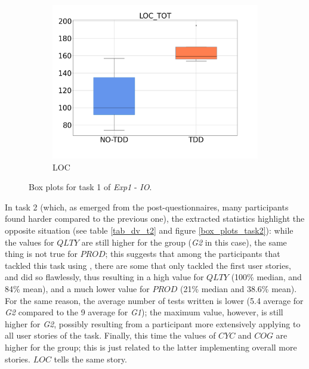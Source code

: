 \begin{figure}[H]
\begin{subfigure}{0.33\textwidth}
        \includegraphics[width=\linewidth]{figures/box_plots/task1/LOC.png}
        \caption{LOC}
        \label{bp_task1_loc}
    \end{subfigure}
    \caption{Box plots for task 1 of \textit{Exp1} - \textit{IO}.}
    \label{box_plots_task1}
\end{figure}

In task 2 (which, as emerged from the post-questionnaires, many participants found harder compared to the previous one), the extracted statistics highlight the opposite situation (see table \ref{tab_dv_t2} and figure \ref{box_plots_task2}): while the values for $QLTY$ are still higher for the \tdd group (\textit{G2} in this case), the same thing is not true for $PROD$; this suggests that among the participants that tackled this task using \tdd, there are some that only tackled the first user stories, and did so flawlessly, thus resulting in a high value for $QLTY$ (100\% median, and 84\% mean), and a much lower value for $PROD$ (21\% median and 38.6\% mean). 
For the same reason, the average number of tests written is lower (5.4 average for \textit{G2} compared to the 9 average for \textit{G1}); the maximum value, however, is still higher for \textit{G2}, possibly resulting from a participant more extensively applying \tdd to all user stories of the task.
Finally, this time the values of $CYC$ and $COG$ are higher for the \notdd group; this is just related to the latter implementing overall more stories. $LOC$ tells the same story.


